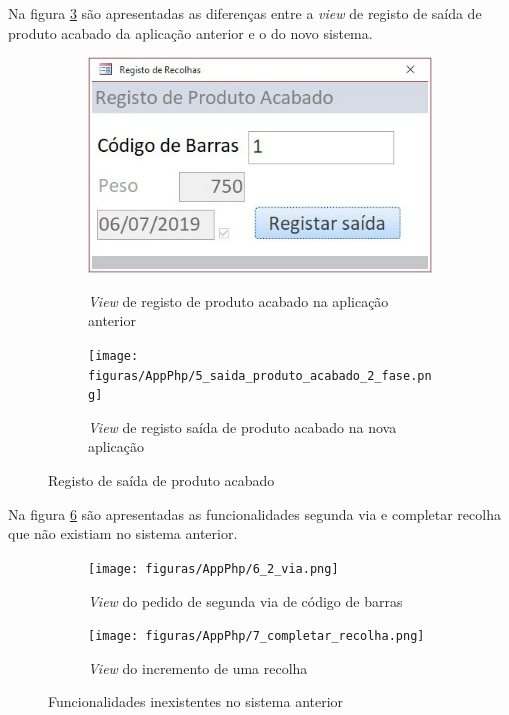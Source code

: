 Na figura \ref{fig:comparacao_prodacabado_saida} são apresentadas as diferenças entre a \textit{view} de registo de saída de produto acabado da aplicação anterior e o do novo sistema.
\begin{figure}[H]
	\centering
	
	\begin{subfigure}[t]{0.40\linewidth}
		\includegraphics[width=\linewidth]{figuras/AppAccess/5-SaidaProdutoAcabado.jpg}
		\label{fig:comparacao_prodacabado_saida_1}
		\caption{\textit{View} de registo de produto acabado na aplicação anterior}
	\end{subfigure}
	\begin{subfigure}[t]{0.50\linewidth}
		\texttt{[image: figuras/AppPhp/5\_saida\_produto\_acabado\_2\_fase.png]}
		\label{fig:comparacao_prodacabado_saida_2}
		\caption{\textit{View} de registo saída de produto acabado na nova aplicação}
	\end{subfigure}
	
	\caption{Registo de saída de produto acabado}
	\label{fig:comparacao_prodacabado_saida}
\end{figure}

Na figura \ref{fig:comparacao_novasfunc} são apresentadas as funcionalidades segunda via e completar recolha que não existiam no sistema anterior.
\begin{figure}[H]
	\centering
	
	\begin{subfigure}[t]{0.45\linewidth}
		\texttt{[image: figuras/AppPhp/6\_2\_via.png]}
		\label{fig:comparacao_novasfunc_1}
		\caption{\textit{View} do pedido de segunda via de código de barras}
	\end{subfigure}
	\begin{subfigure}[t]{0.45\linewidth}
		\texttt{[image: figuras/AppPhp/7\_completar\_recolha.png]}
		\label{fig:comparacao_novasfunc_2}
		\caption{\textit{View} do incremento de uma recolha}
	\end{subfigure}
	
	\caption{Funcionalidades inexistentes no sistema anterior}
	\label{fig:comparacao_novasfunc}
\end{figure}

